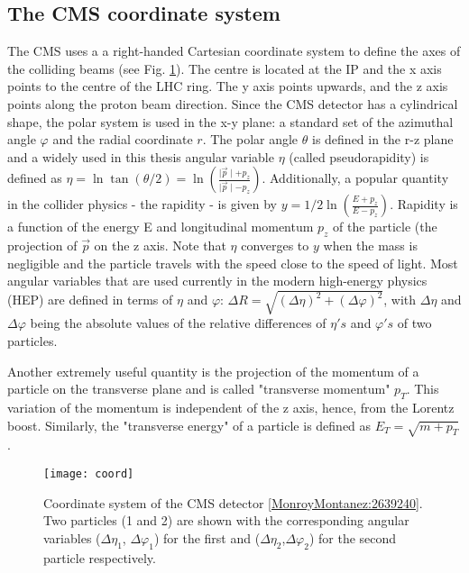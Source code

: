\begin{normalsize}


\subsection{The CMS coordinate system}

The CMS uses a a right-handed Cartesian coordinate system to define the axes of the colliding beams (see Fig. \ref{coord}). The centre is located at the IP and the x axis points to the centre of the LHC ring. The y axis points upwards, and the z axis points along the proton beam direction. Since the CMS detector has a cylindrical shape, the polar system is used in the x-y plane: a standard set of the azimuthal angle $\varphi$ and the radial coordinate $r$. The polar angle $\theta$ is defined in the r-z plane and a widely used in this thesis angular variable $\eta$ (called pseudorapidity) is defined as $\eta = \ln \tan(\theta/2) = \ln (\frac{\mid \vec{p}\mid + p_z}{\mid \vec{p}\mid - p_z})$. Additionally, a popular quantity in the collider physics - the rapidity - is given by $y = 1/2 \ln ( \frac{E + p_z}{E - p_z})$. Rapidity is a function of the energy E and longitudinal momentum $p_z$ of the particle (the projection of $\vec{p}$ on the z axis. 
Note that $\eta$ converges to $y$ when the mass is negligible and the particle travels with the speed close to the speed of light. Most angular variables that are used currently in the modern high-energy physics (HEP) are defined in terms of $\eta$ and $\varphi$:
$ \Delta R = \sqrt{(\Delta \eta)^2 + (\Delta \varphi)^2}$, with $\Delta \eta$ and $\Delta \varphi$ being the absolute values of the relative differences of $\eta's$ and $\varphi 's$ of two particles. 

Another extremely useful quantity is the projection of the momentum of a particle on the transverse plane and is called "transverse momentum" $p_T$. This variation of the momentum is independent of the z axis, hence, from the Lorentz boost.  Similarly, the "transverse energy" of a particle is defined as $E_T = \sqrt{m + p_T }$. 


\begin{figure}[H]
  \centering
  \texttt{[image: coord]}
  \caption[Coordinate system of the CMS detector]{Coordinate system of the CMS detector \ref{MonroyMontanez:2639240}. Two particles (1 and 2) are shown with the corresponding angular variables ($\Delta \eta_1$, $\Delta \varphi_1$) for the first and ($\Delta \eta_2$,$ \Delta \varphi_2$) for the second particle respectively.}
  \label{coord}
\end{figure}


\end{normalsize}
